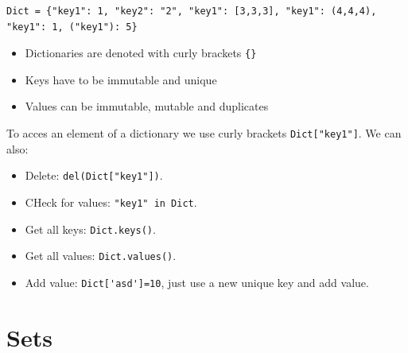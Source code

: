 \documentclass[../../data_analysis_python.tex]{subfiles}
\begin{document}
    \begin{lstlisting}[caption={caption},label=DescriptiveLabel]
Dict = {"key1": 1, "key2": "2", "key1": [3,3,3], "key1": (4,4,4), "key1": 1, ("key1"): 5}
    \end{lstlisting}

    \begin{itemize}
        \item Dictionaries are denoted with curly brackets \lstinline|{}|
        \item Keys have to be immutable and unique
        \item Values can be immutable, mutable and duplicates
    \end{itemize}

    To acces an element of a dictionary we use curly brackets \lstinline|Dict["key1"]|. We can also:
    \begin{itemize}
        \item Delete: \lstinline|del(Dict["key1"])|.
        \item CHeck for values: \lstinline|"key1" in Dict|.
        \item Get all keys: \lstinline|Dict.keys()|.
        \item Get all values: \lstinline|Dict.values()|.
        \item Add value: \lstinline|Dict['asd']=10|, just use a new unique key and add value.
    \end{itemize}

    \section{Sets}

    
\end{document}
